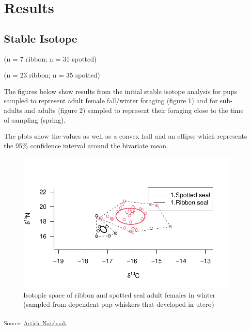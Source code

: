 \documentclass[
  authoryear,
  preprint,
  3p,
  onecolumn]{elsarticle}
\begin{document}
\section{Results}\label{results}

\subsection{Stable Isotope}\label{stable-isotope}

(n = 7 ribbon; n = 31 spotted)

(n = 23 ribbon; n = 35 spotted)

The figures below show results from the initial stable isotope analysis
for pups sampled to represent adult female fall/winter foraging (figure
1) and for sub-adults and adults (figure 2) sampled to represent their
foraging close to the time of sampling (spring).

The plots show the values as well as a convex hull and an ellipse which
represents the 95\% confidence interval around the bivariate mean.

\begin{figure}[H]

{\centering \includegraphics{index_files/figure-pdf/unnamed-chunk-15-1.pdf}

}

\caption{Isotopic space of ribbon and spotted seal adult females in
winter (sampled from dependent pup whiskers that developed in-utero)}

\end{figure}%

\textsubscript{Source:
\href{https://noaa-afsc.github.io/ribbon-spotted-niche-partition/index.qmd.html}{Article
Notebook}}
\end{document}
